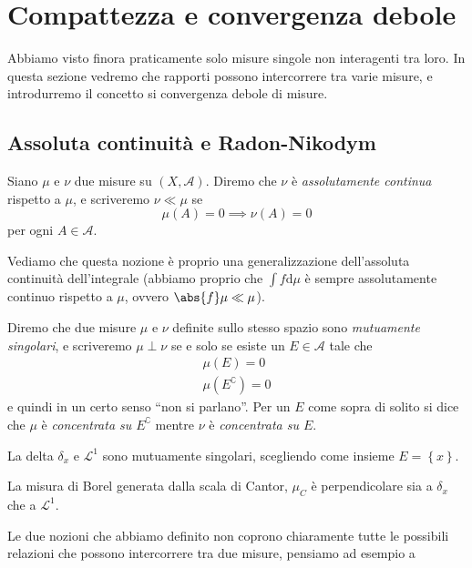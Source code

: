 \documentclass[11pt]{scrartcl}
\newcommand{\dif}{\text{d}}
\begin{document}
	\newpage
	
	\section{Compattezza e convergenza debole}
	Abbiamo visto finora praticamente solo misure singole non interagenti tra loro. In questa sezione vedremo che rapporti possono intercorrere tra varie misure, e introdurremo il concetto si convergenza debole di misure.
	
	\subsection{Assoluta continuità e Radon-Nikodym}
	
	\begin{definition}
		Siano $\mu$ e $\nu$ due misure su $(X,\mathcal{A})$. Diremo che $\nu$ è \textit{assolutamente continua} rispetto a $\mu$, e scriveremo $\nu\ll \mu$ se 
		$$\mu(A)=0 \implies \nu(A)=0$$
		per ogni $A\in \mathcal{A}$.
	\end{definition}
	Vediamo che questa nozione è proprio una generalizzazione dell'assoluta continuità dell'integrale (abbiamo proprio che $\int f \dif \mu $ è sempre assolutamente continuo rispetto a $\mu$, ovvero $\abs{f}\mu \ll \mu$).
	\begin{definition}
		Diremo che due misure $\mu$ e $\nu$ definite sullo stesso spazio sono \textit{mutuamente singolari}, e scriveremo $\mu \perp \nu$ se e solo se esiste un $E\in \mathcal{A}$ tale che
		\begin{gather*}
			\mu(E)= 0 \\
			\mu(E^\complement)=0
		\end{gather*}
		e quindi in un certo senso ``non si parlano''. Per un $E$ come sopra di solito si dice che $\mu$ è \textit{concentrata su $E^\complement$} mentre $\nu$ è \textit{concentrata su $E$}.
	\end{definition}
	\begin{example}[Delta]
		La delta $\delta_x$ e $\mathscr{L}^1$ sono mutuamente singolari, scegliendo come insieme $E=\left\{x\right\}$.
	\end{example}
	\begin{example}[Cantor]
		La misura di Borel generata dalla scala di Cantor, $\mu_C$ è perpendicolare sia a $\delta_x$ che a $\mathscr{L}^1$.
	\end{example}
	Le due nozioni che abbiamo definito non coprono chiaramente tutte le possibili relazioni che possono intercorrere tra due misure, pensiamo ad esempio a 
\end{document}
